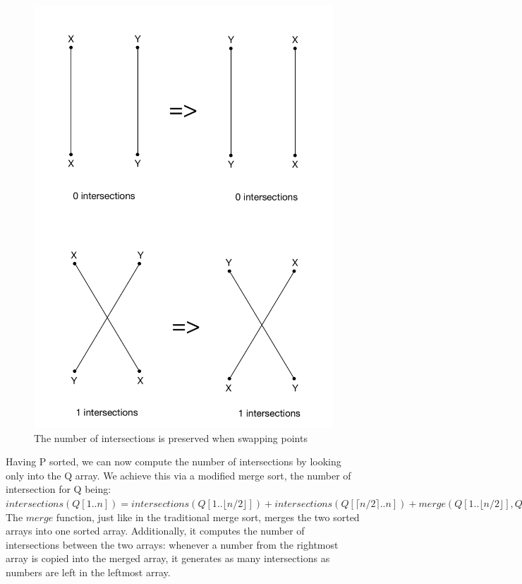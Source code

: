 \begin{figure}
    \centering
    \includegraphics[scale=0.35]{1b-intersections}
    \caption{The number of intersections is preserved when swapping points}
    \label{fig:pointSwap}
\end{figure}

Having P sorted, we can now compute the number of intersections by looking only into the Q array. We achieve this via a modified merge sort, the number of intersection for Q being: \\

$intersections(Q[1..n]) = intersections(Q[1 .. \lfloor n/2 \rfloor]) + intersections(Q[\lceil n/2 \rceil .. n]) + merge(Q[1 .. \lfloor n/2 \rfloor], Q[\lceil n/2 \rceil .. n])$ \\

The $merge$ function, just like in the traditional merge sort, merges the two sorted arrays into one sorted array. 
Additionally, it computes the number of intersections between the two arrays: whenever a number from the rightmost array is copied into the merged array, it generates as many intersections as numbers are left in the leftmost array.

